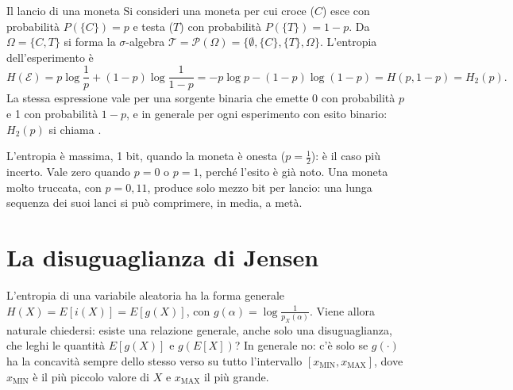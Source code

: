 \begin{esempio}{Il lancio di una moneta}
Si consideri una moneta per cui croce ($C$) esce con probabilità $P(\{C\}) = p$ e testa ($T$) con probabilità
$P(\{T\}) = 1 - p$. Da $\Omega = \{C, T\}$ si forma la $\sigma$-algebra $\mathcal{T} = \mathcal{P}(\Omega) = \{\emptyset,
\{C\}, \{T\}, \Omega\}$. L'entropia dell'esperimento è
\[ H(\mathcal{E}) = p \log \frac{1}{p} + (1 - p) \log \frac{1}{1 - p} = -p \log p - (1 - p) \log(1 - p) = H(p, 1 - p)
   = H_2(p) . \]
La stessa espressione vale per una sorgente binaria che emette 0 con probabilità $p$ e 1 con probabilità $1 - p$, e in
generale per ogni esperimento con esito binario: $H_2(p)$ si chiama .
\begin{center}
\end{center}
L'entropia è massima, 1 bit, quando la moneta è onesta ($p = \frac12$): è il caso più incerto. Vale zero quando $p = 0$
o $p = 1$, perché l'esito è già noto. Una moneta molto truccata, con $p = 0{,}11$, produce solo mezzo bit per lancio:
una lunga sequenza dei suoi lanci si può comprimere, in media, a metà.
\end{esempio}

\section{La disuguaglianza di Jensen}

L'entropia di una variabile aleatoria ha la forma generale $H(X) = E[i(X)] = E[g(X)]$, con $g(\alpha) = \log
\frac{1}{p_X(\alpha)}$. Viene allora naturale chiedersi: esiste una relazione generale, anche solo una disuguaglianza,
che leghi le quantità $E[g(X)]$ e $g(E[X])$? In generale no: c'è solo se $g(\cdot)$ ha la concavità sempre dello stesso
verso su tutto l'intervallo $[x_{\text{MIN}}, x_{\text{MAX}}]$, dove $x_{\text{MIN}}$ è il più piccolo valore di $X$ e
$x_{\text{MAX}}$ il più grande.

